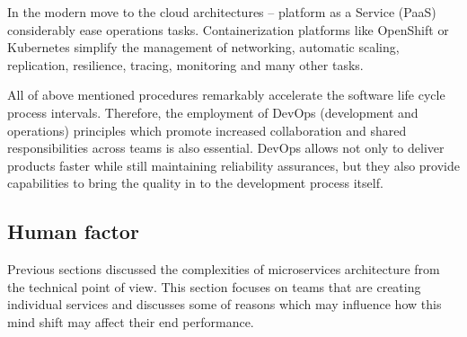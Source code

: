 \documentclass[oneside,
  digital, %
  table,   %
  nolof,     %
  nolot,     %
]{fithesis3}
\begin{document}
In the modern move to the cloud architectures -- platform as a Service (PaaS) considerably ease operations tasks. Containerization platforms like OpenShift \cite{openshift} or Kubernetes \cite{kubernetes} simplify the management of networking, automatic scaling, replication, resilience, tracing, monitoring and many other tasks.

All of above mentioned procedures remarkably accelerate the software life cycle process intervals. Therefore, the employment of DevOps (development and operations) principles which promote increased collaboration and shared responsibilities across teams is also essential. DevOps allows not only to deliver products faster while still maintaining reliability assurances, but they also provide capabilities to bring the quality in to the development process itself.

\subsection{Human factor}

Previous sections discussed the complexities of microservices architecture from the technical point of view. This section focuses on teams that are creating individual services and discusses some of reasons which may influence how this mind shift may affect their end performance.
\end{document}
